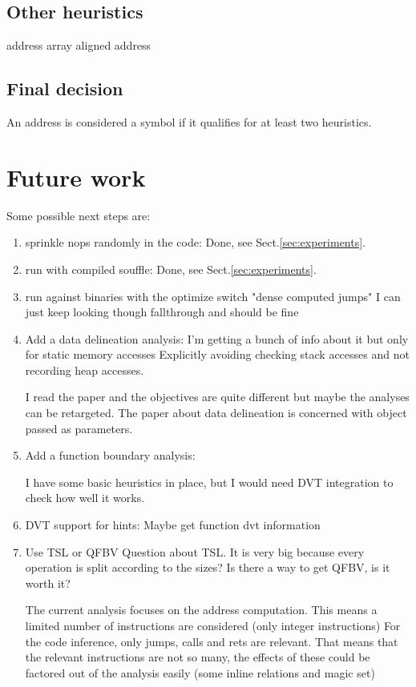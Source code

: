 \documentclass[]{llncs}
\begin{document}
\subsection{Other heuristics}

address array
aligned address

\subsection{Final decision}
An address is considered a symbol if it qualifies for at least two heuristics.


\section{Future work}

  Some possible next steps are:
  \begin{enumerate}
  \item sprinkle nops randomly in the code:
    Done, see Sect.\ref{sec:experiments}.
  \item run with compiled souffle:
    Done, see Sect.\ref{sec:experiments}.
  \item run against binaries with the optimize switch "dense computed jumps"
    I can just keep looking though fallthrough and should be fine

  \item Add a data delineation analysis:
    I'm getting a bunch of info about it but only for static memory accesses
    Explicitly avoiding checking stack accesses and not recording heap accesses.
    
    I read the paper and the objectives are quite different but maybe the analyses
    can be retargeted. The paper about data delineation is concerned with object
    passed as parameters.

  \item Add a function boundary analysis:

    I have some basic heuristics in place, but I would need DVT integration
    to check how well it works.

  \item DVT support for hints:
    Maybe get function dvt information
  \item Use TSL or QFBV
    Question about TSL. It is very big because every operation is split according to
    the sizes? Is there a way to get QFBV, is it worth it?

    The current analysis focuses on the address computation. This means a limited number
    of instructions are considered (only integer instructions)
    For the code inference, only jumps, calls and rets are relevant.
    That means that the relevant instructions are not so many, the effects of these could
    be factored out of the analysis easily (some inline relations and magic set)

  \end{enumerate}
\end{document}
